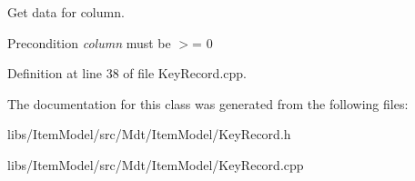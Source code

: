 Get data for column. 

\begin{DoxyPrecond}{Precondition}
{\itshape column} must be $>$= 0 
\end{DoxyPrecond}


Definition at line 38 of file Key\+Record.\+cpp.



The documentation for this class was generated from the following files\+:\begin{DoxyCompactItemize}
\item 
libs/\+Item\+Model/src/\+Mdt/\+Item\+Model/Key\+Record.\+h\item 
libs/\+Item\+Model/src/\+Mdt/\+Item\+Model/Key\+Record.\+cpp\end{DoxyCompactItemize}

